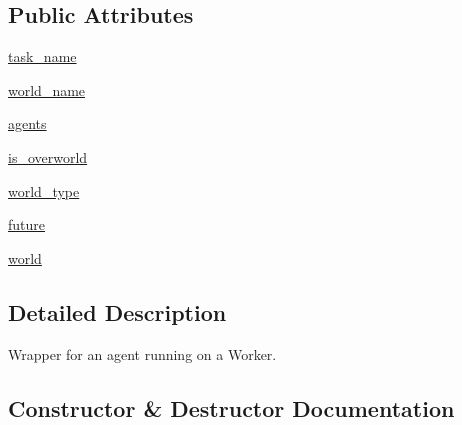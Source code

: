 \subsection*{Public Attributes}
\begin{DoxyCompactItemize}
\item 
\hyperlink{classparlai_1_1chat__service_1_1services_1_1messenger_1_1shared__utils_1_1TaskState_a34a947c51b78f84f79de8e87d8e1cf5b}{task\+\_\+name}
\item 
\hyperlink{classparlai_1_1chat__service_1_1services_1_1messenger_1_1shared__utils_1_1TaskState_a83fab38feda407c392bd8ea32eb19607}{world\+\_\+name}
\item 
\hyperlink{classparlai_1_1chat__service_1_1services_1_1messenger_1_1shared__utils_1_1TaskState_a2e39f33ab663bb7345223e90f0dd530d}{agents}
\item 
\hyperlink{classparlai_1_1chat__service_1_1services_1_1messenger_1_1shared__utils_1_1TaskState_ad19ea555a240eec41329931887b93475}{is\+\_\+overworld}
\item 
\hyperlink{classparlai_1_1chat__service_1_1services_1_1messenger_1_1shared__utils_1_1TaskState_a10ad5170d1a6686bed914cb5b070fc6c}{world\+\_\+type}
\item 
\hyperlink{classparlai_1_1chat__service_1_1services_1_1messenger_1_1shared__utils_1_1TaskState_aace1bab47cfac9b108e1f285727b8996}{future}
\item 
\hyperlink{classparlai_1_1chat__service_1_1services_1_1messenger_1_1shared__utils_1_1TaskState_a236456f6ad3f79512dbd7e6084a44e37}{world}
\end{DoxyCompactItemize}


\subsection{Detailed Description}
\begin{DoxyVerb}Wrapper for an agent running on a Worker.
\end{DoxyVerb}
 

\subsection{Constructor \& Destructor Documentation}
\mbox{\label{classparlai_1_1chat__service_1_1services_1_1messenger_1_1shared__utils_1_1TaskState_af134b6fb0f8a86f34b3c3d2c17d18dc1}} 
